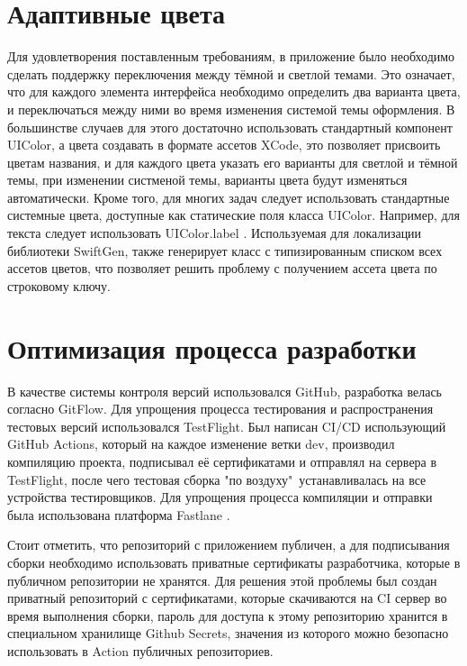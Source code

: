   \section{Адаптивные цвета}
    Для удовлетворения поставленным требованиям, в приложение было необходимо сделать поддержку переключения между тёмной и светлой темами. Это означает, что для каждого элемента интерфейса необходимо определить два варианта цвета, и переключаться между ними во время изменения системой темы оформления. В большинстве случаев для этого достаточно использовать стандартный компонент UIColor, а цвета создавать в формате ассетов XCode, это позволяет присвоить цветам названия, и для каждого цвета указать его варианты для светлой и тёмной темы, при изменении систменой темы, варианты цвета будут изменяться автоматически. Кроме того, для многих задач следует использовать стандартные системные цвета, доступные как статические поля класса UIColor. Например, для текста следует использовать UIColor.label\cite{dark-color-cheat-sheet} .
    Используемая для локализации библиотеки SwiftGen, также генерирует класс с типизированным списком всех ассетов цветов, что позволяет решить проблему с получением ассета цвета по строковому ключу.

  \section{Оптимизация процесса разработки}
    В качестве системы контроля версий использовался GitHub, разработка велась согласно GitFlow. Для упрощения процесса тестирования и распространения тестовых версий использовался TestFlight. Был написан CI/CD использующий GitHub Actions, который на каждое изменение ветки dev, производил компиляцию проекта, подписывал её сертификатами и отправлял на сервера в TestFlight, после чего тестовая сборка "по воздуху"\ устанавливалась на все устройства тестировщиков. Для упрощения процесса компиляции и отправки была использована платформа Fastlane \cite{Fastlane}.

    Стоит отметить, что репозиторий с приложением публичен, а для подписывания сборки необходимо использовать приватные сертификаты разработчика, которые в публичном репозитории не хранятся. Для решения этой проблемы был создан приватный репозиторий с сертификатами, которые скачиваются на CI сервер во время выполнения сборки, пароль для доступа к этому репозиторию хранится в специальном хранилище Github Secrets, значения из которого можно безопасно использовать в Action публичных репозиториев.

